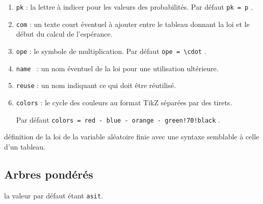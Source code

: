 \documentclass[12pt,a4paper]{article}
\theoremstyle{definition}
\begin{document}
\begin{enumerate}
    \item \verb#pk# : la lettre à indicer pour les valeurs des probabilités.
		  \hfill
		  Par défaut \verb#pk = p# .\verb#      #


    \medskip

    \item \verb#com# : un texte court éventuel à ajouter entre le tableau donnant la loi et le début du calcul de l'espérance.


    \medskip

    \item \verb#ope# : le symbole de multiplication.
		  \hfill
		  Par défaut \verb#ope = \cdot# .


    \medskip

    \item \verb#name # : un nom éventuel de la loi pour une utilisation ultérieure.

    \item \verb#reuse# : un nom indiquant ce qui doit être réutilisé.


    \medskip

    \item \verb#colors# : le cycle des couleurs au format TikZ séparées par des tirets.
		  
		  \smallskip
		  
		  \hfill
		  Par défaut \verb#colors = red - blue - orange - green!70!black# .
\end{enumerate}
%
%
\IDarg{} définition de la loi de la variable aléatoire finie avec une syntaxe semblable à celle d'un tableau.





























\subsection{Arbres pondérés}





\IDoption{} la valeur par défaut étant \verb#asit#.
            
\end{document}

